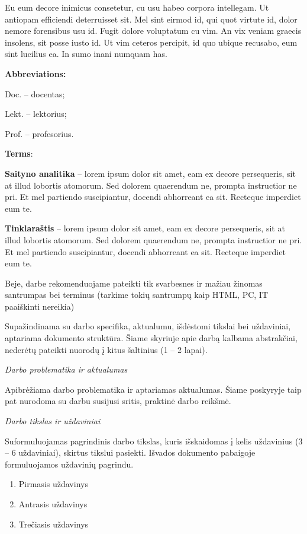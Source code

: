 \documentclass{ktuthesis}
\begin{document}
  Eu eum decore inimicus consetetur, cu usu habeo corpora intellegam. Ut antiopam efficiendi deterruisset sit. Mel sint eirmod id, qui quot virtute id, dolor nemore forensibus usu id. Fugit dolore voluptatum cu vim. An vix veniam graecis insolens, sit posse iusto id. Ut vim ceteros percipit, id quo ubique recusabo, eum sint lucilius ea. In sumo inani numquam has.

  \clearpage
  
  \tableofcontents
  \clearpage

  \listoftables
  \clearpage

  \listoffigures
  \clearpage


  \textbf{Abbreviations:}

  Doc. – docentas;

  Lekt. – lektorius;

  Prof. – profesorius.

  \textbf{Terms}:

  \textbf{Saityno analitika} – lorem ipsum dolor sit amet, eam ex decore persequeris, sit at illud lobortis atomorum. Sed dolorem quaerendum ne, prompta instructior ne pri. Et mel partiendo suscipiantur, docendi abhorreant ea sit. Recteque imperdiet eum te.

  \textbf{Tinklaraštis} – lorem ipsum dolor sit amet, eam ex decore persequeris, sit at illud lobortis atomorum. Sed dolorem quaerendum ne, prompta instructior ne pri. Et mel partiendo suscipiantur, docendi abhorreant ea sit. Recteque imperdiet eum te.

  Beje, darbe rekomenduojame pateikti tik svarbesnes ir mažiau žinomas santrumpas bei terminus (tarkime tokių santrumpų kaip HTML, PC, IT paaiškinti nereikia)
  \clearpage


  Supažindinama su darbo specifika, aktualumu, išdėstomi tikslai bei uždaviniai, aptariama dokumento struktūra. Šiame skyriuje apie darbą kalbama abstrakčiai, nederėtų pateikti nuorodų į kitus šaltinius (1 – 2 lapai).

  \textit{Darbo problematika ir aktualumas}

  Apibrėžiama darbo problematika ir aptariamas aktualumas. Šiame poskyryje taip pat nurodoma su darbu susijusi sritis, praktinė darbo reikšmė.

  \textit{Darbo tikslas ir uždaviniai}

  Suformuluojamas pagrindinis darbo tikslas, kuris išskaidomas į kelis uždavinius (3 – 6 uždaviniai), skirtus tikslui pasiekti. Išvados dokumento pabaigoje formuluojamos uždavinių pagrindu.
  \begin{enumerate}
    \item Pirmasis uždavinys
    \item Antrasis uždavinys
    \item Trečiasis uždavinys
  \end{enumerate}
\end{document}
